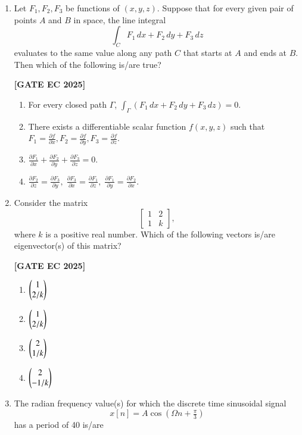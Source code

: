 \documentclass[12pt]{article}
\begin{document}
\begin{enumerate}[leftmargin=1.5em, label=\textbf{Q.\arabic*}., itemsep=2em]
\item Let $F_1, F_2, F_3$ be functions of $(x,y,z)$. Suppose that for every given pair of points $A$ and $B$ in space, the line integral
\[
\int_C F_1\,dx + F_2\,dy + F_3\,dz
\]
evaluates to the same value along any path $C$ that starts at $A$ and ends at $B$. Then which of the following is/are true?

\noindent \textbf{[GATE EC 2025]}
\begin{multicols}{2}
\begin{enumerate}
    \item For every closed path $\Gamma$, $\int_\Gamma (F_1\,dx+F_2\,dy+F_3\,dz)=0$.
    \item There exists a differentiable scalar function $f(x,y,z)$ such that $F_1=\tfrac{\partial f}{\partial x}, F_2=\tfrac{\partial f}{\partial y}, F_3=\tfrac{\partial f}{\partial z}$.
    \item $\tfrac{\partial F_1}{\partial x} + \tfrac{\partial F_2}{\partial y} + \tfrac{\partial F_3}{\partial z} = 0$.
    \item $\tfrac{\partial F_2}{\partial z} = \tfrac{\partial F_3}{\partial y}, \;\tfrac{\partial F_3}{\partial x} = \tfrac{\partial F_1}{\partial z}, \;\tfrac{\partial F_1}{\partial y} = \tfrac{\partial F_2}{\partial x}$.
\end{enumerate}
\end{multicols}

\item Consider the matrix
\[
\begin{bmatrix}
1 & 2 \\
1 & k
\end{bmatrix},
\]
where $k$ is a positive real number. Which of the following vectors is/are eigenvector(s) of this matrix?

\noindent \textbf{[GATE EC 2025]}
\begin{multicols}{2}
\begin{enumerate}
    \item $\begin{pmatrix}1 \\ 2/k\end{pmatrix}$
    \item $\begin{pmatrix}1 \\ 2/k\end{pmatrix}$
    \item $\begin{pmatrix}2 \\ 1/k\end{pmatrix}$
    \item $\begin{pmatrix}2 \\ -1/k\end{pmatrix}$
\end{enumerate}
\end{multicols}

\item The radian frequency value(s) for which the discrete time sinusoidal signal
\[
x[n] = A\cos(\Omega n + \tfrac{\pi}{3})
\]
has a period of 40 is/are


\end{enumerate}
\end{document}
